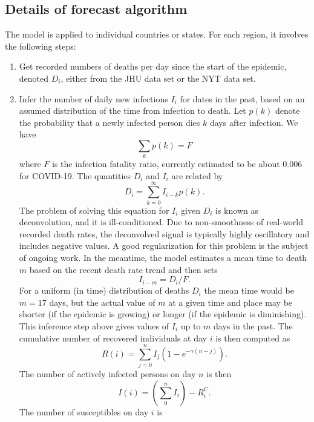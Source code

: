 \documentclass[english,12pt,letter]{article}
\newcommand{\ifr}{F}
\begin{document}
\subsection{Details of forecast algorithm}
The model is applied to individual countries or states.  For each region, it
involves the following steps:
\begin{enumerate}
    \item Get recorded numbers of deaths per day since the start of the
            epidemic, denoted $D_i$, either from the JHU data set or the NYT data set.
    \item Infer the number of daily new infections $I_i$ for dates in the past,
            based on an assumed distribution of the time from infection to
            death.  Let $p(k)$ denote the probability that a newly infected
            person dies $k$ days after infection.  We have
            $$
                \sum_k p(k) = \ifr
            $$
            where $\ifr$ is the infection fatality ratio, currently estimated
            to be about 0.006 for COVID-19.
            The quantities $D_i$ and $I_i$ are related by
            $$
                 D_i = \sum_{k=0}^\infty I_{i-k} p(k).
            $$ 
            The problem of solving this equation for $I_i$ given $D_i$ is 
            known as deconvolution, and it is ill-conditioned.  Due to non-smoothness
            of real-world recorded death rates, the deconvolved signal is
            typically  highly oscillatory and includes negative values.
            A good regularization for this problem is the subject of ongoing
            work.  In the meantime, the model estimates a mean time to death $m$
            based on the recent death rate trend and then sets
            $$
                I_{i-m} = D_i / \ifr.
            $$
            For a uniform (in time) distribution of deaths $D_i$ the mean time
            would be $m=17$ days, but the actual value of $m$ at a given time
            and place may be shorter (if the epidemic is growing) or longer (if the
            epidemic is diminishing).
            This inference step above gives values of $I_i$ up to $m$ days in the past. 
            The cumulative number of recovered individuals at day $i$ is then computed
            as
            $$
                R(i) = \sum_{j=0}^n I_j (1-e^{-\gamma(n-j)}).
            $$
            The number of actively infected persons on day $n$ is then
            $$
                I(i) = (\sum_0^n I_i) - R^C_i.
            $$
            The number of susceptibles on day $i$ is
            $$
$$
\end{enumerate}
\end{document}
